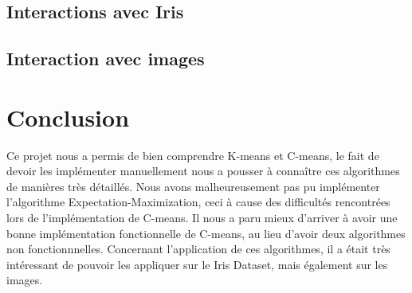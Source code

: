 \documentclass{article}
\begin{document}
    \subsection{Interactions avec Iris}

    \subsection{Interaction avec images}

  \section{Conclusion}

  Ce projet nous a permis de bien comprendre K-means et C-means, le fait de devoir les implémenter
  manuellement nous a pousser à connaître ces algorithmes de manières très détaillés.
  Nous avons malheureusement pas pu implémenter l'algorithme Expectation-Maximization,
  ceci à cause des difficultés rencontrées lors de l'implémentation de C-means.
  Il nous a paru mieux d'arriver à avoir une bonne implémentation fonctionnelle de C-means,
  au lieu d'avoir deux algorithmes non fonctionnnelles.
  Concernant l'application de ces algorithmes,
  il a était très intéressant de pouvoir les appliquer sur le Iris Dataset, mais également sur les images.
\end{document}
